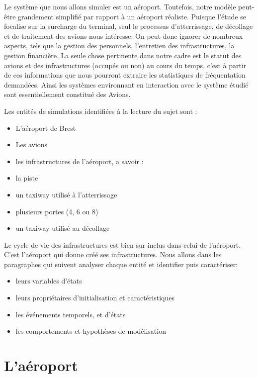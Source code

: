 
Le système que nous allons simuler est un aéroport. Toutefois, notre modèle peut-être grandement simplifié par rapport à  un aéroport réaliste. Puisque l'étude se focalise sur la surcharge du terminal, seul le processus d'atterrissage, de décollage et de traitement des avions nous intéresse. On peut donc ignorer de nombreux aspects, tels que la gestion des personnels, l'entretien des infrastructures, la gestion financière.
La seule chose pertinente dans notre cadre est le statut des avions et des infrastructures (occupés ou non) au cours du temps. c'est à partir de ces informations que nous pourront extraire les statistiques de fréquentation demandées.
Ainsi les systèmes environnant en interaction avec le système étudié sont essentiellement constitué des Avions.


Les entités de simulations identifiées à la lecture du sujet sont :
\begin{itemize}[label=--]
\item L'aéroport de Brest
\item Les avions
\item les infrastructures de l'aéroport, a savoir :
\end{itemize}

\begin{itemize}[leftmargin=3cm]
	\item la piste
	\item un taxiway utilisé à l'atterrissage
	\item plusieurs portes (4, 6 ou 8)
	\item un taxiway utilisé au décollage
\end{itemize}


Le cycle de vie des infrastructures est bien sur inclus dans celui de l'aéroport. C'est l'aéroport qui donne créé ses infrastructures. Nous allons dans les paragraphes qui suivent analyser chaque entité et identifier puis caractériser:
\begin{itemize}[label=--]
\item leurs variables d'états
\item leurs propriétaires d'initialisation et caractéristiques
\item les événements temporels, et d'états
\item les comportements et hypothèses de modélisation
\end{itemize} 

\section{L'aéroport}

